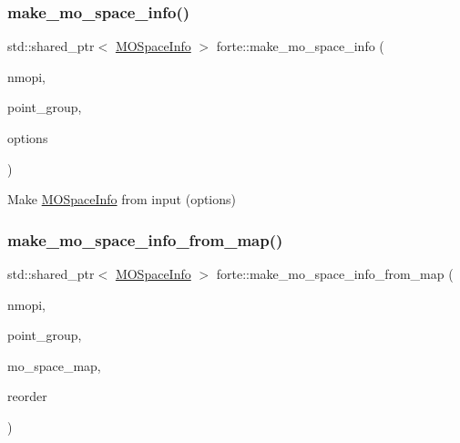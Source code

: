 \mbox{\label{namespaceforte_aa9f89022974a234d0346f3da95429247}} 
\subsubsection{\texorpdfstring{make\+\_\+mo\+\_\+space\+\_\+info()}{make\_mo\_space\_info()}}
{\footnotesize\ttfamily std\+::shared\+\_\+ptr$<$ \mbox{\hyperlink{classforte_1_1_m_o_space_info}{M\+O\+Space\+Info}} $>$ forte\+::make\+\_\+mo\+\_\+space\+\_\+info (\begin{DoxyParamCaption}\item[{const psi\+::\+Dimension \&}]{nmopi,  }\item[{const std\+::string \&}]{point\+\_\+group,  }\item[{std\+::shared\+\_\+ptr$<$ \mbox{\hyperlink{classforte_1_1_forte_options}{Forte\+Options}} $>$}]{options }\end{DoxyParamCaption})}



Make \mbox{\hyperlink{classforte_1_1_m_o_space_info}{M\+O\+Space\+Info}} from input (options) 

\mbox{\label{namespaceforte_a3e043074979348f86b002b2087141750}} 
\subsubsection{\texorpdfstring{make\+\_\+mo\+\_\+space\+\_\+info\+\_\+from\+\_\+map()}{make\_mo\_space\_info\_from\_map()}}
{\footnotesize\ttfamily std\+::shared\+\_\+ptr$<$ \mbox{\hyperlink{classforte_1_1_m_o_space_info}{M\+O\+Space\+Info}} $>$ forte\+::make\+\_\+mo\+\_\+space\+\_\+info\+\_\+from\+\_\+map (\begin{DoxyParamCaption}\item[{const psi\+::\+Dimension \&}]{nmopi,  }\item[{const std\+::string \&}]{point\+\_\+group,  }\item[{std\+::map$<$ std\+::string, std\+::vector$<$ size\+\_\+t $>$$>$ \&}]{mo\+\_\+space\+\_\+map,  }\item[{std\+::vector$<$ size\+\_\+t $>$}]{reorder }\end{DoxyParamCaption})}



